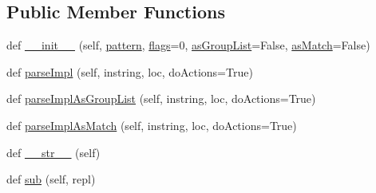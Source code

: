 \subsection*{Public Member Functions}
\begin{DoxyCompactItemize}
\item 
def \hyperlink{classpip_1_1__vendor_1_1pyparsing_1_1Regex_a2b44bd1ca05c000b25dac463c7190972}{\+\_\+\+\_\+init\+\_\+\+\_\+} (self, \hyperlink{classpip_1_1__vendor_1_1pyparsing_1_1Regex_a2ed74ecc3a9dc55ebe66e16de60d67c3}{pattern}, \hyperlink{classpip_1_1__vendor_1_1pyparsing_1_1Regex_a0a0d4a62fef747d491b7b52a632de44f}{flags}=0, \hyperlink{classpip_1_1__vendor_1_1pyparsing_1_1Regex_af54627850828eeff5296f812ce4b3b0a}{as\+Group\+List}=False, \hyperlink{classpip_1_1__vendor_1_1pyparsing_1_1Regex_aa0a6717ee54d3490717b6674554e68a5}{as\+Match}=False)
\item 
def \hyperlink{classpip_1_1__vendor_1_1pyparsing_1_1Regex_a55512fee467cee04f8e69269117e4e44}{parse\+Impl} (self, instring, loc, do\+Actions=True)
\item 
def \hyperlink{classpip_1_1__vendor_1_1pyparsing_1_1Regex_ab909f5ca3e27f1ea4a878fa71257a851}{parse\+Impl\+As\+Group\+List} (self, instring, loc, do\+Actions=True)
\item 
def \hyperlink{classpip_1_1__vendor_1_1pyparsing_1_1Regex_a35c45ed5956f0c06943710e5a2d36279}{parse\+Impl\+As\+Match} (self, instring, loc, do\+Actions=True)
\item 
def \hyperlink{classpip_1_1__vendor_1_1pyparsing_1_1Regex_aeb871b63e1311123d401c41d2d08bcc0}{\+\_\+\+\_\+str\+\_\+\+\_\+} (self)
\item 
def \hyperlink{classpip_1_1__vendor_1_1pyparsing_1_1Regex_a4b46be9791fbf42a4a24543d762dc6bc}{sub} (self, repl)
\end{DoxyCompactItemize}
